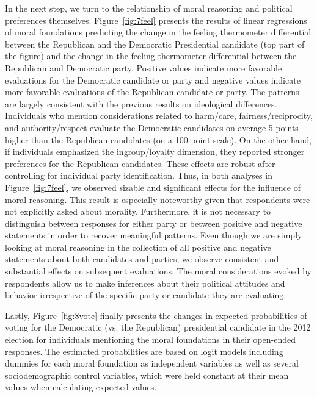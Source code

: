 \documentclass[12pt]{article}
\begin{document}
In the next step, we turn to the relationship of moral reasoning and political preferences themselves. Figure~\ref{fig:7feel} presents the results of linear regressions of moral foundations predicting the change in the feeling thermometer differential between the Republican and the Democratic Presidential candidate (top part of the figure) and the change in the feeling thermometer differential between the Republican and Democratic party. Positive values indicate more favorable evaluations for the Democratic candidate or party and negative values indicate more favorable evaluations of the Republican candidate or party. The patterns are largely consistent with the previous results on ideological differences. Individuals who mention considerations related to harm/care, fairness/reciprocity, and authority/respect evaluate the Democratic candidates on average 5 points higher than the Republican candidates (on a 100 point scale). On the other hand, if individuals emphasized the ingroup/loyalty dimension, they reported stronger preferences for the Republican candidates. These effects are robust after controlling for individual party identification. Thus, in both analyses in Figure~\ref{fig:7feel}, we observed sizable and significant effects for the influence of moral reasoning. This result is especially noteworthy given that respondents were not explicitly asked about morality. Furthermore, it is not necessary to distinguish between responses for either party or between positive and negative statements in order to recover meaningful patterns. Even though we are simply looking at moral reasoning in the collection of all positive and negative statements about both candidates and parties, we observe consistent and substantial effects on subsequent evaluations. The moral considerations evoked by respondents allow us to make inferences about their political attitudes and behavior irrespective of the specific party or candidate they are evaluating.

Lastly, Figure~\ref{fig:8vote} finally presents the changes in expected probabilities of voting for the Democratic (vs. the Republican) presidential candidate in the 2012 election for individuals mentioning the moral foundations in their open-ended responses. The estimated probabilities are based on logit models including dummies for each moral foundation as independent variables as well as several sociodemographic control variables, which were held constant at their mean values when calculating expected values.
\end{document}
